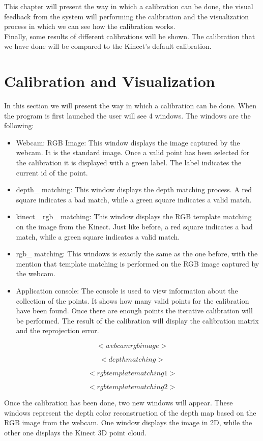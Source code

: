 \noindent
This chapter will present the way in which a calibration can be done, the visual feedback from the system will performing the calibration and the visualization process in which we can see how the calibration works.
\\
Finally, some results of different calibrations will be shown. The calibration that we have done will be compared to the Kinect's default calibration. 

\section{Calibration and Visualization}
In this section we will present the way in which a calibration can be done. When the program is first launched the user will see 4 windows. The windows are the following:
\begin{itemize}
	\item Webcam: RGB Image: This window displays the image captured by the webcam. It is the standard image. Once a valid point has been selected for the calibration it is displayed with a green label. The label indicates the current id of the point.  
	\item depth\_ matching: This window displays the depth matching process. A red square indicates a bad match, while a green square indicates a valid match.
	\item kinect\_ rgb\_ matching: This window displays the RGB template matching on the image from the Kinect. Just like before, a red square indicates a bad match, while a green square indicates a valid match. 
	\item rgb\_ matching: This windows is exactly the same as the one before, with the mention that template matching is performed on the RGB image captured by the webcam. 
	\item Application console: The console is used to view information about the collection of the points. It shows how many valid points for the calibration have been found. Once there are enough points the iterative calibration will be performed. The result of the calibration will display the calibration matrix and the reprojection error. 
\end{itemize}

$$ <webcam rgb image> $$

$$ <depth matching> $$

$$ <rgb template matching 1> $$

$$ <rgb template matching 2> $$

\noindent
Once the calibration has been done, two new windows will appear. These windows represent the depth color reconstruction of the depth map based on the RGB image from the webcam. One window displays the image in 2D, while the other one displays the Kinect 3D point cloud. 


